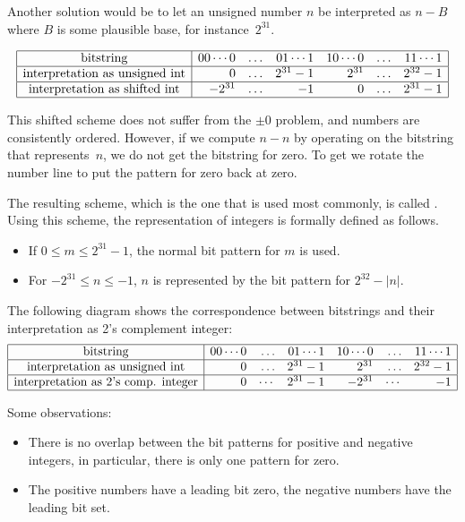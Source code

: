 Another solution would be to let an unsigned number $n$ be interpreted
as $n-B$ where $B$ is some plausible base, for instance~$2^{31}$.

\[
\begin{array}{|c|rrrrrr|}
  \hline
  \hbox{bitstring}&
  00\cdots0&\ldots&01\cdots1&
  10\cdots0&\ldots&11\cdots1\\ \hline
  \hbox{interpretation as unsigned int}&
  0&\ldots&2^{31}-1&
  2^{31}&\ldots&2^{32}-1\\ \hline
  \hbox{interpretation as shifted int}&
  -2^{31}&\ldots&-1&
  0&\ldots&2^{31}-1\\ \hline
\end{array}
\]

This shifted scheme does not suffer from the $\pm0$ problem, and
numbers are consistently ordered. However, if we compute $n-n$
by operating on the bitstring that represents~$n$, we do not 
get the bitstring for zero. To get we rotate the number line
to put the pattern for zero back at zero.

The resulting scheme, which is the one that is used most commonly, is
called . Using this scheme,
the representation of integers is
formally defined as follows.
\begin{itemize}
\item If $0\leq m\leq 2^{31}-1$, the normal bit pattern for $m$ is
  used.
\item For $-2^{31}\leq n\leq -1$, $n$ is represented by the bit
  pattern for $2^{32}-|n|$.
\end{itemize}
The following diagram shows the correspondence between bitstrings and
their interpretation as 2's complement integer:
\[
\begin{array}{|c|rrrrrr|}
  \hline
  \hbox{bitstring}&
  00\cdots0&\ldots&01\cdots1&
  10\cdots0&\ldots&11\cdots1\\ \hline
  \hbox{interpretation as unsigned int}&
  0&\ldots&2^{31}-1&
  2^{31}&\ldots&2^{32}-1\\ \hline
  \hbox{interpretation as 2's comp. integer}&
  0&\cdots&2^{31}-1&
  -2^{31}&\cdots&-1\\
  \hline
\end{array}
\]

Some observations:
\begin{itemize}
\item There is no overlap between the bit patterns for positive and
  negative integers, in particular, there is only one pattern for zero.
\item The positive numbers have a leading bit zero, the negative
  numbers have the leading bit set.
\end{itemize}

